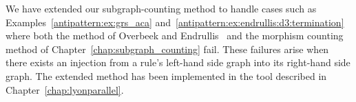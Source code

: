 We have extended our subgraph-counting method to handle cases such as 
Examples~\ref{antipattern:ex:grs_aca} and~\ref{antipattern:ex:endrullis:d3:termination} where both the method of Overbeek and Endrullis~\cite{overbeek2024termination_lmcs} and the morphism counting method of Chapter~\ref{chap:subgraph_counting} fail. These failures arise when there exists an injection from a rule's left-hand side graph into its right-hand side graph. The extended method has been implemented in the tool described in Chapter~\ref{chap:lyonparallel}.
